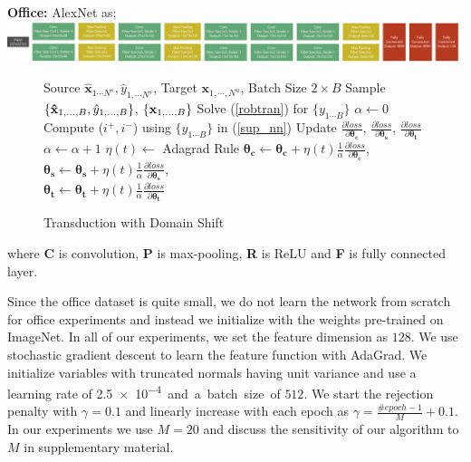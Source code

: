 \noindent \textbf{Office:} AlexNet\cite{alexnet} as; \includegraphics[width=0.73\columnwidth]{alexnet}

\begin{figure}
    \begin{minipage}{0.5\textwidth}
    \vspace{-9mm}
\begin{algorithm}[H]
   \caption{Transduction with Domain Shift}
   \label{alg:example}
  \small
\begin{algorithmic}
    Source $\mathbf{\hat{x}}_{1 \cdots N^s},\hat{y}_{1, \cdots N^s}$, Target $\mathbf{x}_{1,\cdots,N^u}$, Batch Size $2\times B$
   \STATE  Sample $\{\mathbf{\hat{x}}_{1,\ldots,B},\hat{y}_{1,\ldots,B} \}$, $\{\mathbf{x}_{1,\ldots,B}\}$
   \STATE Solve (\ref{robtran}) for $\{y_{1 \cdots B}\}$
   \STATE $\alpha \leftarrow 0$
   \STATE Compute ($i^+, i^-$) using $\{y_{1 \cdots B}\}$ in (\ref{sup_nn})
   \STATE Update $\frac{\partial loss}{\partial \mathbf{\theta_c}}$,  $\frac{\partial loss}{\partial \mathbf{\theta_s}}$, $\frac{\partial loss}{\partial \mathbf{\theta_t}}$
   \STATE $\alpha \leftarrow \alpha + 1$
   \ENDIF
   \ENDFOR
   \STATE $\eta(t) \leftarrow$ Adagrad Rule \cite{adagrad}
   \STATE $\mathbf{\theta_c} \leftarrow \mathbf{\theta_c} + \eta(t) \frac{1}{\alpha} \frac{\partial loss}{\partial \mathbf{\theta_c}}$, $\mathbf{\theta_s} \leftarrow \mathbf{\theta_s} + \eta(t) \frac{1}{\alpha} \frac{\partial loss}{\partial \mathbf{\theta_s}}$, \\ $\mathbf{\theta_t} \leftarrow \mathbf{\theta_t} + \eta(t) \frac{1}{\alpha} \frac{\partial loss}{\partial \mathbf{\theta_t}}$
   \ENDIF
   \ENDFOR
\end{algorithmic}
\end{algorithm}
\vspace{-18mm}
  \end{minipage}
  \end{figure}
  
  where \textbf{C} is convolution, \textbf{P} is max-pooling, \textbf{R} is ReLU and \textbf{F} is fully connected layer. 


Since the office dataset is quite small, we do not learn the network from scratch for office experiments and instead we initialize with the weights pre-trained on ImageNet. In all of our experiments, we set the feature dimension as $128$. We use stochastic gradient descent to learn the feature function with AdaGrad\cite{adagrad}. We initialize variables with truncated normals having unit variance and use a learning rate of \SI{2.5e-4}  and a batch size of $512$. We start the rejection penalty with $\gamma=0.1$ and linearly increase with each epoch as $\gamma=\frac{\#epoch -1}{M}+0.1$. In our experiments we use $M=20$ and discuss the sensitivity of our algorithm to $M$ in supplementary material.
  